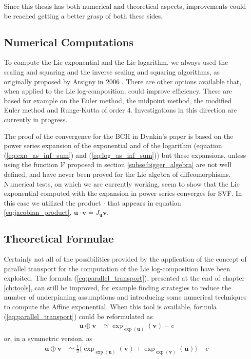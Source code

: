Since this thesis has both numerical and theoretical aspects, improvements could be reached getting a better grasp of both these sides.

\subsection{Numerical Computations} 

To compute the Lie exponential and the Lie logarithm, we always used the scaling and squaring and the inverse scaling and squaring algorithms, as originally proposed by Arsigny in $2006$ \cite{arsigny2006log}. There are other options available that, when applied to the Lie log-composition, could improve efficiency. These are based for example on the Euler method, the midpoint method, the modified Euler method and Runge-Kutta of order $4$. Investigations in this direction are currently in progress.

The proof of the convergence for the BCH in Dynkin's paper is based on the power series expansion of the exponential and of the logarithm (equation (\ref{eq:exp_as_inf_sum}) and (\ref{eq:log_as_inf_sum}))
but these expansions, unless using the function $\mathcal{V}$ proposed in section \ref{subse:bigger_algebra} are not well defined, and have never been proved for the Lie algebra of diffeomorphisms.
Numerical tests, on which we are currently working, seem to show that the Lie exponential computed with the expansion in power series converges for SVF. In this case we utilized the product $\cdot$ that appears in equation \ref{eq:jacobian_product}, $\mathbf{u}\cdot \mathbf{v} = J_{\mathbf{u}} \mathbf{v}$.

\subsection{Theoretical Formulae}

Certainly not all of the possibilities provided by the application of the concept of parallel transport for the computation of the Lie log-composition have been exploited. The formula (\ref{eq:parallel_transport}), presented at the end of chapter \ref{ch:tools}, can still be improved, for example finding strategies to reduce the number of underpinning assumptions and introducing some numerical techniques to compute the Affine exponential. When this tool is available, formula (\ref{eq:parallel_transport}) could be reformulated as
\begin{align*}
\mathbf{u}\oplus \mathbf{v}
&\simeq
\exp_{\exp(\mathbf{u} )}(\mathbf{v} ) - e
\end{align*} 
or, in a symmetric version,  as
\begin{align*}
\mathbf{u}\oplus \mathbf{v}
&\simeq
\frac{1}{2}
\big(
\exp_{\exp(\mathbf{u} )}(\mathbf{v} ) 
+
\exp_{\exp(\mathbf{v} )}(\mathbf{u} )
\big)
-  e
\end{align*} 

